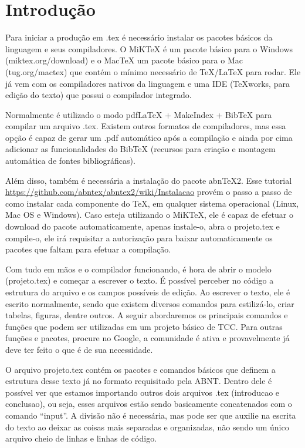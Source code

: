 \chapter{Introdução}
\label{c.introducao}

Para iniciar a produção em .tex é necessário instalar os pacotes básicos da linguagem e seus compiladores. O MiKTeX é um pacote básico para o Windows (miktex.org/download) e o MacTeX um pacote básico para o Mac (tug.org/mactex) que contém o mínimo necessário de TeX/LaTeX para rodar. Ele já vem com os compiladores nativos da linguagem e uma IDE (TeXworks, para edição do texto) que possui o compilador integrado.

Normalmente é utilizado o modo pdfLaTeX + MakeIndex + BibTeX para compilar um arquivo .tex. Existem outros formatos de compiladores, mas essa opção é capaz de gerar um .pdf automático após a compilação e ainda por cima adicionar as funcionalidades do BibTeX (recursos para criação e montagem automática de fontes bibliográficas).

Além disso, também é necessária a instalação do pacote abnTeX2. Esse tutorial \url{https://github.com/abntex/abntex2/wiki/Instalacao} provém o passo a passo de como instalar cada componente do TeX, em qualquer sistema operacional (Linux, Mac OS e Windows). Caso esteja utilizando o MiKTeX, ele é capaz de efetuar o download do pacote automaticamente, apenas instale-o, abra o projeto.tex e compile-o, ele irá requisitar a autorização para baixar automaticamente os pacotes que faltam para efetuar a compilação.

Com tudo em mãos e o compilador funcionando, é hora de abrir o modelo (projeto.tex) e começar a escrever o texto. É possível perceber no código a estrutura do arquivo e os campos possíveis de edição. Ao escrever o texto, ele é escrito normalmente, sendo que existem diversos comandos para estilizá-lo, criar tabelas, figuras, dentre outros. A seguir abordaremos os principais comandos e funções que podem ser utilizadas em um projeto básico de TCC. Para outras funções e pacotes, procure no Google, a comunidade é ativa e provavelmente já deve ter feito o que é de sua necessidade.

O arquivo projeto.tex contém os pacotes e comandos básicos que definem a estrutura desse texto já no formato requisitado pela ABNT. Dentro dele é possível ver que estamos importando outros dois arquivos .tex (introducao e conclusao), ou seja, esses arquivos estão sendo basicamente concatenados com o comando ``input''. A divisão não é necessária, mas pode ser que auxilie na escrita do texto  ao deixar as coisas mais separadas e organizadas, não sendo um único arquivo cheio de linhas e linhas de código.


